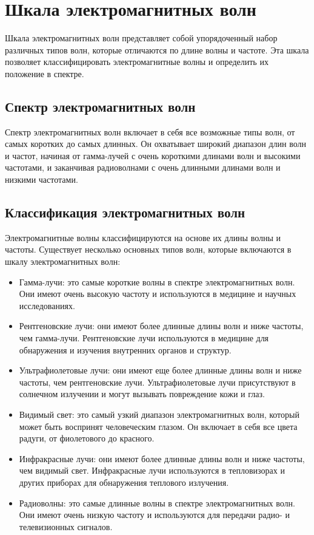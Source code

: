 \documentclass{article}
\begin{document}
\newpage
\section{Шкала электромагнитных волн}
Шкала электромагнитных волн представляет собой упорядоченный набор различных типов волн, которые отличаются по длине волны и частоте. Эта шкала позволяет классифицировать электромагнитные волны и определить их положение в спектре.
\subsection{Спектр электромагнитных волн}
Спектр электромагнитных волн включает в себя все возможные типы волн, от самых коротких до самых длинных. Он охватывает широкий диапазон длин волн и частот, начиная от гамма-лучей с очень короткими длинами волн и высокими частотами, и заканчивая радиоволнами с очень длинными длинами волн и низкими частотами.
\subsection{Классификация электромагнитных волн}
Электромагнитные волны классифицируются на основе их длины волны и частоты. Существует несколько основных типов волн, которые включаются в шкалу электромагнитных волн:
\begin{itemize}
\item Гамма-лучи: это самые короткие волны в спектре электромагнитных волн. Они имеют очень высокую частоту и используются в медицине и научных исследованиях.
\item Рентгеновские лучи: они имеют более длинные длины волн и ниже частоты, чем гамма-лучи. Рентгеновские лучи используются в медицине для обнаружения и изучения внутренних органов и структур.
\item Ультрафиолетовые лучи: они имеют еще более длинные длины волн и ниже частоты, чем рентгеновские лучи. Ультрафиолетовые лучи присутствуют в солнечном излучении и могут вызывать повреждение кожи и глаз.
\item Видимый свет: это самый узкий диапазон электромагнитных волн, который может быть воспринят человеческим глазом. Он включает в себя все цвета радуги, от фиолетового до красного.
\item Инфракрасные лучи: они имеют более длинные длины волн и ниже частоты, чем видимый свет. Инфракрасные лучи используются в тепловизорах и других приборах для обнаружения теплового излучения.
\item Радиоволны: это самые длинные волны в спектре электромагнитных волн. Они имеют очень низкую частоту и используются для передачи радио- и телевизионных сигналов.
\end{itemize}
\end{document}
